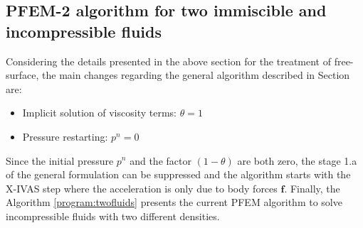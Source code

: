 \subsection[PFEM-2 free-surface algorithm]{PFEM-2 algorithm for two immiscible and incompressible fluids}

Considering the details presented in the above section for the treatment of free-surface, the main changes regarding the general algorithm described in Section \label{PFEM_Algorithm} are:
\begin{itemize}
  \item Implicit solution of viscosity terms: $\theta=1$
  \item Pressure restarting: $p^n=0$
\end{itemize}
Since the initial pressure $p^n$ and the factor $(1-\theta)$ are both zero, the stage 1.a of the general formulation can be suppressed and the algorithm starts with the X-IVAS step where the acceleration is only due to body forces $\mathbf{f}$. Finally, the Algorithm \ref{program:twofluids} presents the current PFEM algorithm to solve incompressible fluids with two different densities.

